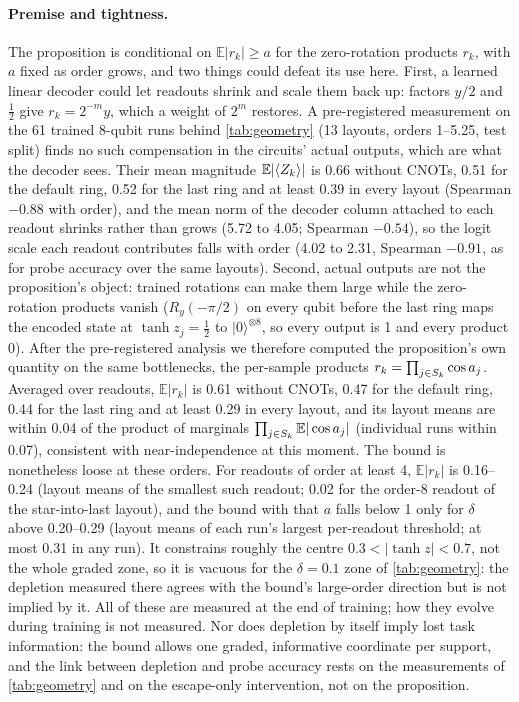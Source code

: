 \paragraph{Premise and tightness.}
\label{app:compensation}
The proposition is conditional on $\mathbb{E}|r_k|\ge a$ for the zero-rotation products $r_k$, with $a$
fixed as order grows, and two things could defeat its use here. First, a learned linear decoder could
let readouts shrink and scale them back up: factors $y/2$ and $\tfrac12$ give $r_k=2^{-m}y$, which a
weight of $2^m$ restores. A pre-registered measurement on the 61 trained 8-qubit runs behind
\cref{tab:geometry} (13 layouts, orders 1--5.25, test split) finds no such compensation in the circuits'
actual outputs, which are what the decoder sees. Their mean magnitude $\mathbb{E}|\langle Z_{k}\rangle|$ is 0.66
without CNOTs, 0.51 for the default ring, 0.52 for the last ring and at least 0.39 in every layout
(Spearman $-0.88$ with order), and the mean norm of the decoder column attached to each readout shrinks
rather than grows (5.72 to 4.05; Spearman $-0.54$), so the logit scale each readout contributes falls
with order (4.02 to 2.31, Spearman $-0.91$, as for probe accuracy over the same layouts). Second, actual
outputs are not the proposition's object: trained rotations can make them large while the zero-rotation
products vanish ($R_y(-\pi/2)$ on every qubit before the last ring maps the encoded state at
$\tanh z_j=\tfrac12$ to $|0\rangle^{\otimes8}$, so every output is 1 and every product 0). After the
pre-registered analysis we therefore computed the proposition's own quantity on the same bottlenecks,
the per-sample products $r_k=\prod_{j\in S_k}\cos a_{j}$. Averaged over readouts, $\mathbb{E}|r_k|$ is 0.61
without CNOTs, 0.47 for the default ring, 0.44 for the last ring and at least 0.29 in every layout, and its layout means are
within 0.04 of the product of marginals $\prod_{j\in S_k}\mathbb{E}|\cos a_{j}|$ (individual runs within 0.07), consistent with
near-independence at this moment. The bound is nonetheless loose at these orders. For readouts of order
at least 4, $\mathbb{E}|r_k|$ is 0.16--0.24 (layout means of the smallest such readout; 0.02 for the
order-8 readout of the star-into-last layout), and the bound with that $a$ falls below 1 only for
$\delta$ above 0.20--0.29 (layout means of each run's largest per-readout threshold; at most 0.31 in any run). It constrains roughly the centre
$0.3<|\tanh z|<0.7$, not the whole graded zone, so it is vacuous for the $\delta=0.1$ zone of
\cref{tab:geometry}: the depletion measured there agrees with the bound's large-order direction but is not implied by it. All of these are measured at the end of training; how they evolve
during training is not measured. Nor does depletion by itself imply lost task information: the bound
allows one graded, informative coordinate per support, and the link between depletion and probe accuracy
rests on the measurements of \cref{tab:geometry} and on the escape-only intervention, not on the
proposition.

